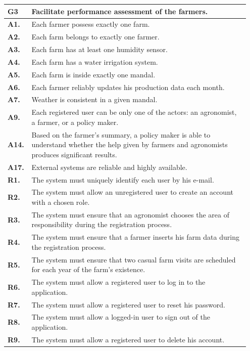 \begin{longtable}{p{0.07\linewidth} p{0.88\linewidth}} 
    \toprule
    \textbf{G3} & Facilitate performance assessment of the farmers. \\ 
    \midrule
    \textbf{A1.} & Each farmer possess exactly one farm.\\
    \textbf{A2.} & Each farm belongs to exactly one farmer.\\ 
    \textbf{A3.} & Each farm has at least one humidity sensor.\\ 
    \textbf{A4.} & Each farm has a water irrigation system.\\ 
    \textbf{A5.} & Each farm is inside exactly one mandal.\\ 
    \textbf{A6.} & Each farmer reliably updates his production data each month.\\ 
    \textbf{A7.} & Weather is consistent in a given mandal.\\     
    \textbf{A9.} & Each registered user can be only one of the actors: an agronomist, a farmer, or a policy maker.\\ 
    \textbf{A14.} & Based on the farmer's summary, a policy maker is able to understand whether the help given by farmers and agronomists produces significant results.\\ 
    \textbf{A17.} & External systems are reliable and highly available.\\
    \midrule
    
	\textbf{R1.} & The system must uniquely identify each user by his e-mail. \\
	\textbf{R2.} & The system must allow an unregistered user to create an account with a chosen role. \\
	\textbf{R3.} & The system must ensure that an agronomist chooses the area of responsibility during the registration process. \\
	\textbf{R4.} & The system must ensure that a farmer inserts his farm data during the registration process.\\
	\textbf{R5.} & The system must ensure that two casual farm visits are scheduled for each year of the farm's existence.\\
	\textbf{R6.} & The system must allow a registered user to log in to the application. \\
	\textbf{R7.} & The system must allow a registered user to reset his password. \\
	\textbf{R8.} & The system must allow a logged-in user to sign out of the application. \\
	\textbf{R9.} & The system must allow a registered user to delete his account. \\
	

\end{longtable}
